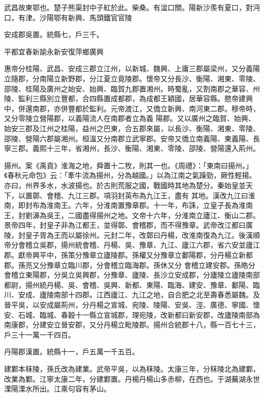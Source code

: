 \begin{pinyinscope}
 武昌故東鄂也。楚子熊渠封中子紅於此。柴桑。有湓口關。陽新沙羨有夏口，對沔口，有津。沙陽鄂有新興、馬頭鐵官官陵



 安成郡吳置。統縣七，戶三千。



 平都宜春新諭永新安復萍鄉廣興



 惠帝分桂陽、武昌、安成三郡立江州，以新城、魏興、上庸三郡屬梁州，又分義陽立隨郡，分南陽立新野郡，分江夏立竟陵郡。懷帝又分長沙、衡陽、湘東、零陵、邵陵、桂陽及廣州之始安、始興、臨賀九郡置湘州。時蜀亂，又割南郡之華容、州陵、監利三縣別立豐都，合四縣置成都郡，為成都王穎國，居華容縣。愍帝建興中，併還南郡，亦併豐都於監利。元帝渡江，又僑立新興、南河東二郡。穆帝時，又分零陵立營陽郡，以義陽流人在南郡者立為義
 陽郡。又以廣州之臨賀、始興、始安三郡及江州之桂陽，益州之巴東，合五郡來屬，以長沙、衡陽、湘東、零陵、邵陵、營陽六郡屬湘州。桓溫又分南郡立武寧郡。安帝又僑立南義陽、東義陽、長寧三郡。義熙十三年，省湘州，長沙、衡陽、湘東、零陵、邵陵、營陽還入荊州。



 揚州。案《禹貢》淮海之地，舜置十二牧，則其一也。《周禮》：「東南曰揚州。」《春秋元命包》云：「牽牛流為揚州，分為越國。」以為江南之氣躁勁，厥性輕揚。亦曰，州界多水，水波揚也。於古則荒服之國，戰國時其地為楚分。秦始皇並天下，以置鄣、會稽、九江三郡。項羽封英布為九江王，盡有
 其地。漢改九江曰淮南，即封布為淮南王。六年，分淮南置豫章郡。十一年，布誅，立皇子長為淮南王，封劉濞為吳王，二國盡得揚州之地。文帝十六年，分淮南立廬江、衡山二郡。景帝四年，封皇子非為江都王，並得鄣、會稽郡，而不得豫章。武帝改江都曰廣陵，封皇子胥為王而以屬徐州。元封二年，改鄣曰丹楊，改淮南復為九江。後漢順帝分會稽立吳郡，揚州統會稽、丹楊、吳、豫章、九江、廬江六郡，省六安並廬江郡。獻帝興平中，孫策分豫章立廬陵郡。孫權又分豫章立鄱陽郡，分丹楊立新都郡。孫亮又分豫章立臨川郡，分會稽立臨海郡。孫休又分
 會稽立建安郡。孫皓分會稽立東陽郡，分吳立吳興郡，分豫章、廬陵、長沙立安成郡，分廬陵立廬陵南部都尉，揚州統丹楊、吳、會稽、吳興、新都、東陽、臨海、建安、豫章、鄱陽、臨川、安成、廬陵南部十四郡。江西廬江、九江之地，自合肥之北至壽春悉屬魏。及晉平吳，以安成屬荊州，分丹楊之宣城、宛陵、陵陽、安吳、涇、廣德、寧國、懷安、石城、臨城、春穀十一縣立宣城郡，理宛陵，改新都曰新安郡，改廬陵南部為南康郡，分建安立晉安郡，又分丹楊立毗陵郡。揚州合統郡十八，縣一百七十三，戶三十一萬一千四百。



 丹陽郡漢置。統縣十一，戶五萬一千五百。



 建鄴本秣陵，孫氏改為建業。武帝平吳，以為秣陵。太康三年，分秣陵北為建鄴，改業為鄴。江寧太康二年，分建鄴置。丹楊丹楊山多赤柳，在西也。于湖蕪湖永世溧陽溧水所出。江乘句容有茅山。




\end{pinyinscope}
